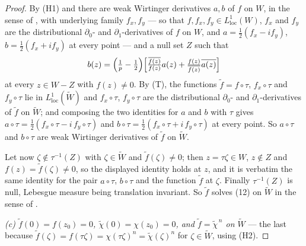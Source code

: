 \begin{proof}
By (H1) and  there are weak Wirtinger derivatives $a,b$ of
$f$ on $W$, in the sense of , with underlying
family $f_x,f_y$ --- so that $f,f_x,f_y\in L^1_{\mathrm{loc}}(W)$, $f_x$ and
$f_y$ are the distributional $\partial_0$- and $\partial_1$-derivatives of $f$
on $W$, and $a=\tfrac12(f_x-if_y)$, $b=\tfrac12(f_x+if_y)$ at every point ---
and a null set $Z$ such that
\[
  b(z)=\Bigl(\tfrac1p-\tfrac12\Bigr)
  \Bigl[\tfrac{\overline{f(z)}}{f(z)}a(z)
    +\tfrac{f(z)}{\overline{f(z)}}\overline{a(z)}\Bigr]
\]
at every $z\in W-Z$ with $f(z)\neq0$.  By (T), the functions
$\tilde f=f\circ\tau$, $f_x\circ\tau$ and $f_y\circ\tau$ lie in
$L^1_{\mathrm{loc}}(\widetilde W)$ and $f_x\circ\tau$, $f_y\circ\tau$ are the
distributional $\partial_0$- and $\partial_1$-derivatives of $\tilde f$ on
$\widetilde W$; and composing the two identities for $a$ and $b$ with $\tau$
gives $a\circ\tau=\tfrac12(f_x\circ\tau-i\,f_y\circ\tau)$ and
$b\circ\tau=\tfrac12(f_x\circ\tau+i\,f_y\circ\tau)$ at every point.  So
$a\circ\tau$ and $b\circ\tau$ are weak Wirtinger derivatives of $\tilde f$ on
$\widetilde W$.

Let now $\zeta\notin\tau^{-1}(Z)$ with $\zeta\in\widetilde W$ and
$\tilde f(\zeta)\neq0$; then $z=\tau\zeta\in W$, $z\notin Z$ and
$f(z)=\tilde f(\zeta)\neq0$, so the displayed identity holds at $z$, and it is
verbatim the same identity for the pair $a\circ\tau$, $b\circ\tau$ and the
function $\tilde f$ at $\zeta$.  Finally $\tau^{-1}(Z)$ is null, Lebesgue
measure being translation invariant.  So $\tilde f$ solves (12) on
$\widetilde W$ in the sense of .

\emph{(c) $\tilde f(0)=f(z_0)=0$, $\tilde\chi(0)=\chi(z_0)=0$, and
$\tilde f=\tilde\chi^{\,n}$ on $\widetilde W$} --- the last because
$\tilde f(\zeta)=f(\tau\zeta)=\chi(\tau\zeta)^n=\tilde\chi(\zeta)^n$ for
$\zeta\in\widetilde W$, using (H2).


\end{proof}
